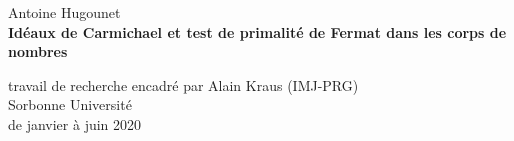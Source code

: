 \begin{center}
	\large Antoine Hugounet \\

	\vspace{25px}
	\LARGE \textbf{Idéaux de Carmichael et test de primalité de Fermat dans les corps de nombres}

	\vspace{25px}
	\large
	travail de recherche encadré par Alain Kraus (IMJ-PRG) \\
	Sorbonne Université \\
	de janvier à juin 2020 \\

	\vspace{1cm}
	\begin{center}
	\end{center}

	\normalsize
	\renewcommand{\contentsname}{}
	\vspace{10px}
	\tableofcontents
\end{center}
